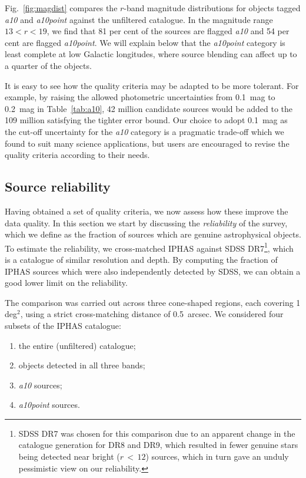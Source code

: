 \documentclass[a4paper,useAMS,usenatbib]{mn2e}
\begin{document}
{Fig.~\ref{fig:magdist} compares the $r$-band magnitude
distributions for objects tagged \emph{a10} and \emph{a10point}
against the unfiltered catalogue.
In the magnitude range $13 < r < 19$,
we find that 81 per cent of the sources 
are flagged \emph{a10}
and 54 per cent are flagged \emph{a10point}.
We will explain below that the
\emph{a10point} category is least complete
at low Galactic longitudes,
where source blending can affect
up to a quarter of the objects.

It is easy to see how the quality criteria
may be adapted to be more tolerant.
For example, by raising the allowed photometric uncertainties
from 0.1~mag to 0.2~mag in Table~\ref{tab:a10},
42 million candidate sources would be added to the 109 
million satisfying the tighter error bound.
Our choice to adopt 0.1~mag as the cut-off uncertainty
for the \emph{a10} category is a pragmatic trade-off
which we found to suit many science applications,
but users are encouraged 
to revise the quality criteria according to their needs.


\subsection{Source reliability}
\label{sec:reliability}

Having obtained a set of quality criteria,
we now assess how these improve the data quality.
In this section we start by discussing
the \emph{reliability} of the survey,
which we define as the fraction of sources
which are genuine astrophysical objects.
To estimate the reliability, we cross-matched IPHAS
against SDSS DR7\footnote{SDSS DR7 was chosen for this comparison
due to an apparent change in 
the catalogue generation for DR8 and DR9,
which resulted in fewer genuine stars being
detected near bright ($r\,<\,12$) sources,
which in turn gave an unduly pessimistic view
on our reliability.},
which is a catalogue of similar resolution and depth.
By computing the fraction of IPHAS sources which were
also independently detected by SDSS,
we can obtain a good lower limit on the reliability.

The comparison was carried out across three cone-shaped regions,
each covering 1 deg$^2$,
using a strict cross-matching distance of 0.5~arcsec.
We considered four subsets of the IPHAS catalogue:
\begin{enumerate}
\item the entire (unfiltered) catalogue;
\item objects detected in all three bands;
\item \emph{a10} sources;
\item \emph{a10point} sources.
\end{enumerate}

}
\end{document}
